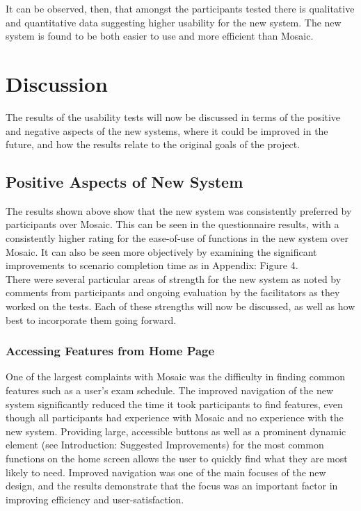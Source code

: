 \documentclass[10pt]{article}
\begin{document}
\begin{multicols}{2}
It can be observed, then,  that amongst the participants tested there is qualitative and quantitative  data suggesting higher usability for the new system. The new system is found to be both easier to use and more efficient than Mosaic.

\section*{Discussion}
The results of the usability tests will now be discussed in terms of the positive and negative aspects of the new systems, where it could be improved in the future, and how the results relate to the original goals of the project.

\subsection*{Positive Aspects of New System}
The results shown above show that the new system was consistently preferred by participants over Mosaic. This can be seen in the questionnaire results, with a consistently higher rating for the ease-of-use of functions in the new system over Mosaic. It can also be seen more objectively by examining the significant improvements to scenario completion time as in Appendix: Figure 4.\\

There were several particular areas of strength for the new system as noted by comments from participants and ongoing evaluation by the facilitators as they worked on the tests. Each of these strengths will now be discussed, as well as how best to incorporate them going forward.

\subsubsection*{Accessing Features from Home Page}
One of the largest complaints with Mosaic was the difficulty in finding common features such as a user's exam schedule. The improved navigation of the new system significantly reduced the time it took participants to find features, even though all participants had experience with Mosaic and no experience with the new system. Providing large, accessible buttons as well as a prominent dynamic element (see Introduction: Suggested Improvements) for the most common functions on the home screen allows the user to quickly find what they are most likely to need. Improved navigation was one of the main focuses of the new design, and the results demonstrate that the focus was an important factor in improving efficiency and user-satisfaction.


\end{multicols}
\end{document}
